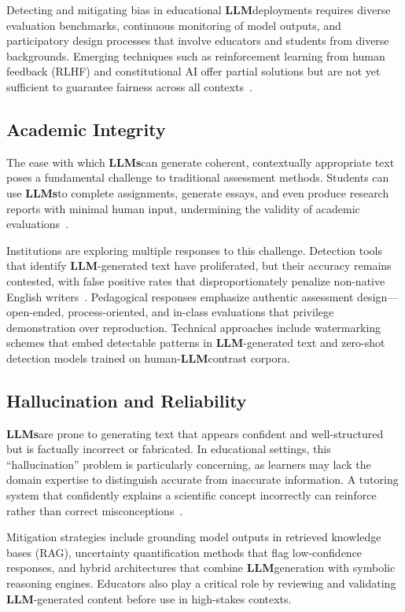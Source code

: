 \documentclass[preprint,12pt]{article}
\newcommand{\LLM}{\textbf{LLM}}
\newcommand{\LLMs}{\textbf{LLMs}}
\theoremstyle{mystyle}
\begin{document}
Detecting and mitigating bias in educational \LLM deployments requires diverse evaluation benchmarks, continuous monitoring of model outputs, and participatory design processes that involve educators and students from diverse backgrounds. Emerging techniques such as reinforcement learning from human feedback (RLHF) and constitutional AI offer partial solutions but are not yet sufficient to guarantee fairness across all contexts~\citep{bai2022constitutional}.

\subsection{Academic Integrity}
\label{sec:integrity}

The ease with which \LLMs can generate coherent, contextually appropriate text poses a fundamental challenge to traditional assessment methods. Students can use \LLMs to complete assignments, generate essays, and even produce research reports with minimal human input, undermining the validity of academic evaluations~\citep{zhao2024academic}.

Institutions are exploring multiple responses to this challenge. Detection tools that identify \LLM-generated text have proliferated, but their accuracy remains contested, with false positive rates that disproportionately penalize non-native English writers~\citep{perelman2024detection}. Pedagogical responses emphasize authentic assessment design---open-ended, process-oriented, and in-class evaluations that privilege demonstration over reproduction. Technical approaches include watermarking schemes that embed detectable patterns in \LLM-generated text and zero-shot detection models trained on human-\LLM contrast corpora.

\subsection{Hallucination and Reliability}
\label{sec:hallucination}

\LLMs are prone to generating text that appears confident and well-structured but is factually incorrect or fabricated. In educational settings, this ``hallucination'' problem is particularly concerning, as learners may lack the domain expertise to distinguish accurate from inaccurate information. A tutoring system that confidently explains a scientific concept incorrectly can reinforce rather than correct misconceptions~\citep{gpt4hallucination2024}.

Mitigation strategies include grounding model outputs in retrieved knowledge bases (RAG), uncertainty quantification methods that flag low-confidence responses, and hybrid architectures that combine \LLM generation with symbolic reasoning engines. Educators also play a critical role by reviewing and validating \LLM-generated content before use in high-stakes contexts.
\end{document}

